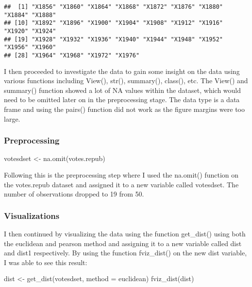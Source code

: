 \documentclass[
]{article}
\newenvironment{Shaded}{\begin{snugshade}}{\end{snugshade}}
\newcommand{\AttributeTok}[1]{\textcolor[rgb]{0.77,0.63,0.00}{#1}}
\newcommand{\FunctionTok}[1]{\textcolor[rgb]{0.00,0.00,0.00}{#1}}
\newcommand{\NormalTok}[1]{#1}
\newcommand{\OtherTok}[1]{\textcolor[rgb]{0.56,0.35,0.01}{#1}}
\newcommand{\StringTok}[1]{\textcolor[rgb]{0.31,0.60,0.02}{#1}}
\begin{document}
\begin{verbatim}
##  [1] "X1856" "X1860" "X1864" "X1868" "X1872" "X1876" "X1880" "X1884" "X1888"
## [10] "X1892" "X1896" "X1900" "X1904" "X1908" "X1912" "X1916" "X1920" "X1924"
## [19] "X1928" "X1932" "X1936" "X1940" "X1944" "X1948" "X1952" "X1956" "X1960"
## [28] "X1964" "X1968" "X1972" "X1976"
\end{verbatim}

I then proceeded to investigate the data to gain some insight on the
data using various functions including View(), str(), summary(),
class(), etc. The View() and summary() function showed a lot of NA
values within the dataset, which would need to be omitted later on in
the preprocessing stage. The data type is a data frame and using the
pairs() function did not work as the figure margins were too large.

\hypertarget{preprocessing}{%
\subsubsection{Preprocessing}\label{preprocessing}}

\begin{Shaded}
\begin{Highlighting}[]
\NormalTok{votesdset }\OtherTok{\textless{}{-}} \FunctionTok{na.omit}\NormalTok{(votes.repub)}
\end{Highlighting}
\end{Shaded}

Following this is the preprocessing step where I used the na.omit()
function on the votes.repub dataset and assigned it to a new variable
called votesdset. The number of observations dropped to 19 from 50.

\hypertarget{visualizations}{%
\subsubsection{Visualizations}\label{visualizations}}

I then continued by visualizing the data using the function get\_dist()
using both the euclidean and pearson method and assigning it to a new
variable called dist and dist1 respectively. By using the function
fviz\_dist() on the new dist variable, I was able to see this result:

\begin{Shaded}
\begin{Highlighting}[]
\NormalTok{dist }\OtherTok{\textless{}{-}} \FunctionTok{get\_dist}\NormalTok{(votesdset, }\AttributeTok{method =} \StringTok{\textquotesingle{}euclidean\textquotesingle{}}\NormalTok{)}
\FunctionTok{fviz\_dist}\NormalTok{(dist)}
\end{Highlighting}
\end{Shaded}
\end{document}

